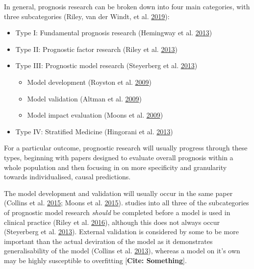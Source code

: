 \documentclass[
]{article}
\providecommand{\tightlist}{%
  \setlength{\itemsep}{0pt}\setlength{\parskip}{0pt}}
\begin{document}
In general, prognosis research can be broken down into four main categories, with three subcategories (Riley, van der Windt, et al. \protect\hyperlink{ref-riley_prognosis_2019}{2019}):
\begin{itemize}
\tightlist
\item
  Type I: Fundamental prognosis research (Hemingway et al. \protect\hyperlink{ref-hemingway_prognosis_2013}{2013})
\item
  Type II: Prognostic factor research (Riley et al. \protect\hyperlink{ref-riley_prognosis_2013}{2013})
\item
  Type III: Prognostic model research (Steyerberg et al. \protect\hyperlink{ref-steyerberg_prognosis_2013}{2013})
  \begin{itemize}
  \tightlist
  \item
    Model development (Royston et al. \protect\hyperlink{ref-royston_prognosis_2009}{2009})
  \item
    Model validation (Altman et al. \protect\hyperlink{ref-altman_prognosis_2009}{2009})
  \item
    Model impact evaluation (Moons et al. \protect\hyperlink{ref-moons_prognosis_2009}{2009})
  \end{itemize}
\item
  Type IV: Stratified Medicine (Hingorani et al. \protect\hyperlink{ref-hingorani_prognosis_2013}{2013})
\end{itemize}
For a particular outcome, prognostic research will usually progress through these types, beginning with papers designed to evaluate overall prognosis within a whole population and then focusing in on more specificity and granularity towards individualised, causal predictions.

The model development and validation will usually occur in the same paper (Collins et al. \protect\hyperlink{ref-collins_transparent_2015}{2015}; Moons et al. \protect\hyperlink{ref-moons_transparent_2015}{2015}). studies into all three of the subcategories of prognostic model research \emph{should} be completed before a model is used in clinical practice (Riley et al. \protect\hyperlink{ref-riley_external_2016}{2016}), although this does not always occur (Steyerberg et al. \protect\hyperlink{ref-steyerberg_prognosis_2013}{2013}). External validation is considered by some to be more important than the actual deviration of the model as it demonstrates generalisability of the model (Collins et al. \protect\hyperlink{ref-collins_systematic_2013}{2013}), whereas a model on it's own may be highly susceptible to overfitting {[}\textbf{Cite: Something}{]}.
\end{document}
